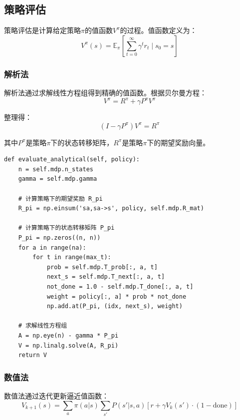\documentclass[12pt,a4paper]{article}
\begin{document}
\subsection{策略评估}

策略评估是计算给定策略$\pi$的值函数$V^\pi$的过程。值函数定义为：
\begin{equation}
V^\pi(s) = \mathbb{E}_\pi\left[\sum_{t=0}^{\infty} \gamma^t r_t \mid s_0 = s\right]
\end{equation}

\subsubsection{解析法}

解析法通过求解线性方程组得到精确的值函数。根据贝尔曼方程：
\begin{equation}
V^\pi = R^\pi + \gamma P^\pi V^\pi
\end{equation}

整理得：
\begin{equation}
(I - \gamma P^\pi)V^\pi = R^\pi
\end{equation}

其中$P^\pi$是策略$\pi$下的状态转移矩阵，$R^\pi$是策略$\pi$下的期望奖励向量。

\begin{lstlisting}[caption={解析法策略评估}]
def evaluate_analytical(self, policy):
    n = self.mdp.n_states
    gamma = self.mdp.gamma
    
    # 计算策略下的期望奖励 R_pi
    R_pi = np.einsum('sa,sa->s', policy, self.mdp.R_mat)
    
    # 计算策略下的状态转移矩阵 P_pi
    P_pi = np.zeros((n, n))
    for a in range(na):
        for t in range(max_t):
            prob = self.mdp.T_prob[:, a, t]
            next_s = self.mdp.T_next[:, a, t]
            not_done = 1.0 - self.mdp.T_done[:, a, t]
            weight = policy[:, a] * prob * not_done
            np.add.at(P_pi, (idx, next_s), weight)
    
    # 求解线性方程组
    A = np.eye(n) - gamma * P_pi
    V = np.linalg.solve(A, R_pi)
    return V
\end{lstlisting}

\subsubsection{数值法}

数值法通过迭代更新逼近值函数：
\begin{equation}
V_{k+1}(s) = \sum_a \pi(a|s) \sum_{s'} P(s'|s,a)[r + \gamma V_k(s') \cdot (1-\text{done})]
\end{equation}
\end{document}
